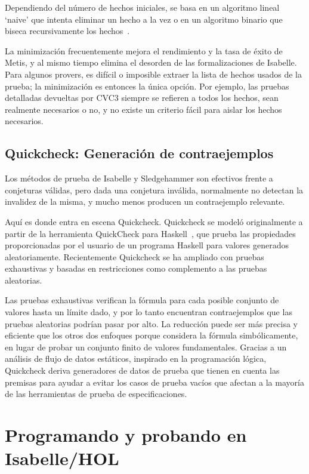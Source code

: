 \documentclass[12pt]{book}
\begin{document}
Dependiendo del número de hechos iniciales, se basa en un algoritmo lineal `naive' que intenta eliminar un hecho a la vez o en un algoritmo binario que biseca recursivamente los hechos~\cite{sledgehammer_judgement_day}.

La minimización frecuentemente mejora el rendimiento y la tasa de éxito de Metis, y al mismo tiempo elimina el desorden de las formalizaciones de Isabelle. Para algunos provers, es difícil o imposible extraer la lista de hechos usados de la prueba; la minimización es entonces la única opción. Por ejemplo, las pruebas detalladas devueltas por CVC3 siempre se refieren a todos los hechos, sean realmente necesarios o no, y no existe un criterio fácil para aislar los hechos necesarios.

\subsection{Quickcheck: Generación de contraejemplos}

Los métodos de prueba de Isabelle y Sledgehammer son efectivos frente a conjeturas válidas, pero dada una conjetura inválida, normalmente no detectan la invalidez de la misma, y mucho menos producen un contraejemplo relevante.

Aquí es donde entra en escena Quickcheck. Quickcheck se modeló originalmente a partir de la herramienta QuickCheck para Haskell~\cite{quickcheck_haskell}, que prueba las propiedades proporcionadas por el usuario de un programa Haskell para valores generados aleatoriamente. Recientemente Quickcheck se ha ampliado con pruebas exhaustivas y basadas en restricciones como complemento a las pruebas aleatorias.

Las pruebas exhaustivas verifican la fórmula para cada posible conjunto de valores hasta un límite dado, y por lo tanto encuentran contraejemplos que las pruebas aleatorias podrían pasar por alto. La reducción puede ser más precisa y eficiente que los otros dos enfoques porque considera la fórmula simbólicamente, en lugar de probar un conjunto finito de valores fundamentales. Gracias a un análisis de flujo de datos estáticos, inspirado en la programación lógica, Quickcheck deriva generadores de datos de prueba que tienen en cuenta las premisas para ayudar a evitar los casos de prueba vacíos que afectan a la mayoría de las herramientas de prueba de especificaciones.


\section{Programando y probando en Isabelle/HOL}
\end{document}
